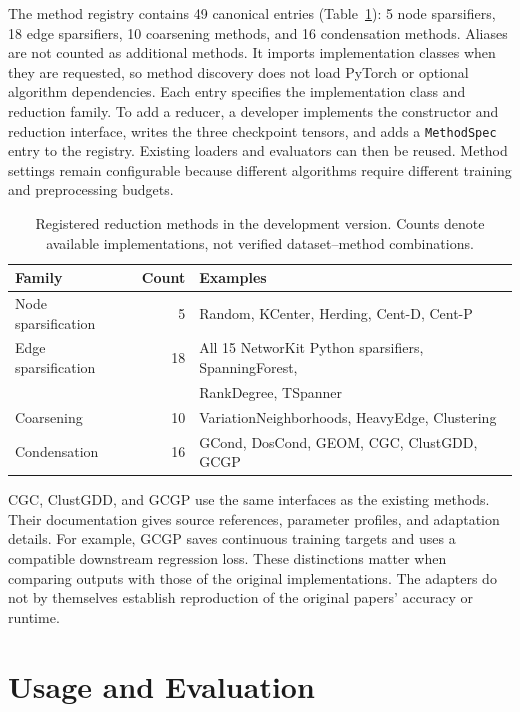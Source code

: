 \documentclass[twoside,11pt]{article}
\begin{document}
The method registry contains 49 canonical entries
(Table~\ref{tab:methods}): 5 node sparsifiers, 18 edge sparsifiers, 10 coarsening
methods, and 16 condensation methods. Aliases are not counted as additional methods.
It imports implementation classes when they are requested, so method discovery
does not load PyTorch or optional algorithm dependencies. Each entry specifies
the implementation class and reduction family. To add a reducer, a developer
implements the constructor and reduction interface, writes the three checkpoint
tensors, and adds a \texttt{MethodSpec} entry to the registry. Existing loaders
and evaluators can then be reused. Method settings remain configurable because
different algorithms require different training and preprocessing budgets.

\begin{table}[htbp]
\centering
\caption{Registered reduction methods in the development version. Counts denote
available implementations, not verified dataset--method combinations.}
\label{tab:methods}
\begin{tabular}{lrl}
\toprule
Family & Count & Examples \\
\midrule
Node sparsification & 5 & Random, KCenter, Herding, Cent-D, Cent-P \\
Edge sparsification & 18 & All 15 NetworKit Python sparsifiers, SpanningForest, \\
 & & RankDegree, TSpanner \\
Coarsening & 10 & VariationNeighborhoods, HeavyEdge, Clustering \\
Condensation & 16 & GCond, DosCond, GEOM, CGC, ClustGDD, GCGP \\
\bottomrule
\end{tabular}
\end{table}

CGC, ClustGDD, and GCGP use the same interfaces as the existing methods.
Their documentation gives source references, parameter profiles, and adaptation
details. For example, GCGP saves continuous training targets and uses a
compatible downstream regression loss. These distinctions matter when comparing
outputs with those of the original implementations. The adapters do not by
themselves establish reproduction of the original papers' accuracy or runtime.

\section{Usage and Evaluation}
\end{document}
